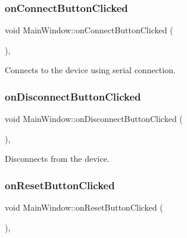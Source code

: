 \subsubsection{\texorpdfstring{on\+Connect\+Button\+Clicked}{onConnectButtonClicked}}
{\footnotesize\ttfamily void Main\+Window\+::on\+Connect\+Button\+Clicked (\begin{DoxyParamCaption}{ }\end{DoxyParamCaption})\hspace{0.3cm}{\ttfamily [private]}, {\ttfamily [slot]}}



Connects to the device using serial connection. 

\mbox{\label{class_main_window_a15190e6af528cd13ddbe387800531ba4}} 
\subsubsection{\texorpdfstring{on\+Disconnect\+Button\+Clicked}{onDisconnectButtonClicked}}
{\footnotesize\ttfamily void Main\+Window\+::on\+Disconnect\+Button\+Clicked (\begin{DoxyParamCaption}{ }\end{DoxyParamCaption})\hspace{0.3cm}{\ttfamily [private]}, {\ttfamily [slot]}}



Disconnects from the device. 

\mbox{\label{class_main_window_a680f2fc34bd2147a3a675060aca0fbc6}} 
\subsubsection{\texorpdfstring{on\+Reset\+Button\+Clicked}{onResetButtonClicked}}
{\footnotesize\ttfamily void Main\+Window\+::on\+Reset\+Button\+Clicked (\begin{DoxyParamCaption}{ }\end{DoxyParamCaption})\hspace{0.3cm}{\ttfamily [private]}, {\ttfamily [slot]}}



